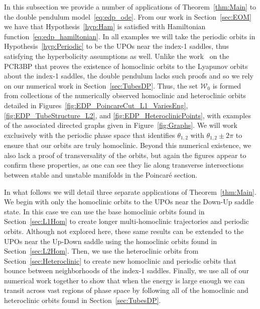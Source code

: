 \documentclass[11pt]{article}
\numberwithin{equation}{section}
\theoremstyle{plain}
\begin{document}
In this subsection we provide a number of applications of Theorem~\ref{thm:Main} to the double pendulum model~\eqref{eq:edp_ode}. From our work in Section~\ref{sec:EOM} we have that Hypothesis~\ref{hyp:Ham} is satisfied with Hamiltonian function~\eqref{eq:edp_hamiltonian}. In all examples we will take the periodic orbits in Hypothesis~\ref{hyp:Periodic} to be the UPOs near the index-1 saddles, thus satisfying the hyperbolicity assumptions as well. Unlike the work~\cite{Conley,McGehee} on the PCR3BP that proves the existence of homoclinic orbits to the Lyapunov orbits about the index-1 saddles, the double pendulum lacks such proofs and so we rely on our numerical work in Section~\ref{sec:TubesDP}. Thus, the set $\mathcal{W}_0$ is formed from collections of the numerically observed homoclinic and heteroclinic orbits detailed in Figures~\ref{fig:EDP_PoincareCut_L1_VariesEng}, \ref{fig:EDP_TubeStructure_L2}, and \ref{fig:EDP_HeteroclinicPoints}, with examples of the associated directed graphs given in Figure~\ref{fig:Graphs}. We will work exclusively with the periodic phase space that identifies $\theta_{1,2}$ with $\theta_{1,2} \pm 2\pi$ to ensure that our orbits are truly homoclinic. Beyond this numerical existence, we also lack a proof of transversality of the orbits, but again the figures appear to confirm these properties, as one can see they lie along transverse intersections between stable and unstable manifolds in the Poincar\'e section.

In what follows we will detail three separate applications of Theorem~\ref{thm:Main}. We begin with only the homoclinic orbits to the UPOs near the Down-Up saddle state. In this case we can use the base homoclinic orbits found in Section~\ref{sec:L1Hom} to create longer multi-homoclinic trajectories and periodic orbits. Although not explored here, these same results can be extended to the UPOs near the Up-Down saddle using the homoclinic orbits found in Section~\ref{sec:L2Hom}. Then, we use the heteroclinic orbits from Section~\ref{sec:Heteroclinic} to create new homoclinic and periodic orbits that bounce between neighborhoods of the index-1 saddles. Finally, we use all of our numerical work together to show that when the energy is large enough we can transit across vast regions of phase space by following all of the homoclinic and heteroclinic orbits found in Section~\ref{sec:TubesDP}.
\end{document}
